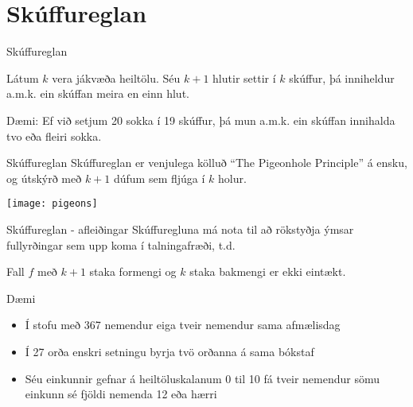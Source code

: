 \documentclass{beamer}
\begin{document}
\section{Skúffureglan}

\begin{frame}{Skúffureglan}
\begin{tcolorbox}[title=Skúffuregla Dirichlets]
Látum $k$ vera jákvæða heiltölu. Séu $k + 1$ hlutir settir í $k$ skúffur, þá inniheldur a.m.k. ein skúffan meira en einn hlut.
\end{tcolorbox}

Dæmi: Ef við setjum 20 sokka í 19 skúffur, þá mun a.m.k. ein skúffan innihalda tvo eða fleiri sokka.
\end{frame}

\begin{frame}{Skúffureglan}
Skúffureglan er venjulega kölluð ``The Pigeonhole Principle'' á ensku, og útskýrð með $k+1$ dúfum sem fljúga í $k$ holur.
\begin{center}
\texttt{[image: pigeons]}
\end{center}
\end{frame}

\begin{frame}{Skúffureglan - afleiðingar}
Skúffuregluna má nota til að rökstyðja ýmsar fullyrðingar sem upp koma í talningafræði, t.d.
\begin{tcolorbox}
Fall $f$ með $k+1$ staka formengi og $k$ staka bakmengi er ekki eintækt.
\end{tcolorbox}
\end{frame}

\begin{frame}{Dæmi}
\begin{itemize}
 \item Í stofu með 367 nemendur eiga tveir nemendur sama afmælisdag
 \item Í 27 orða enskri setningu byrja tvö orðanna á sama bókstaf
 \item Séu einkunnir gefnar á heiltöluskalanum 0 til 10 fá tveir nemendur sömu einkunn sé fjöldi nemenda 12 eða hærri
\end{itemize}
\end{frame}

\end{document}
